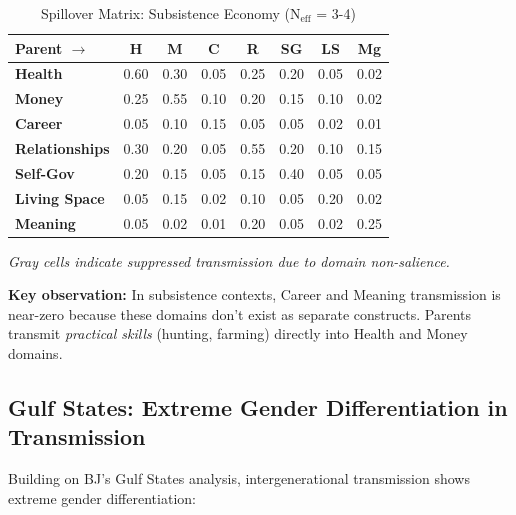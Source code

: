 \begin{table}[htbp]
\centering
\caption{Spillover Matrix: Subsistence Economy (N$_{\text{eff}}$ = 3-4)}
\label{tab:BI-subsistence-spillover}
\renewcommand{\arraystretch}{1.2}
\small
\begin{tabular}{@{}l|ccccccc@{}}
\toprule
\textbf{Parent $\rightarrow$} & \textbf{H} & \textbf{M} & \textbf{C} & \textbf{R} & \textbf{SG} & \textbf{LS} & \textbf{Mg} \\
\midrule
\textbf{Health} & \cellcolor{green!25}0.60 & 0.30 & 0.05 & 0.25 & 0.20 & 0.05 & 0.02 \\
\textbf{Money} & 0.25 & \cellcolor{green!25}0.55 & 0.10 & 0.20 & 0.15 & 0.10 & 0.02 \\
\textbf{Career} & \cellcolor{gray!20}0.05 & \cellcolor{gray!20}0.10 & \cellcolor{gray!20}0.15 & \cellcolor{gray!20}0.05 & \cellcolor{gray!20}0.05 & \cellcolor{gray!20}0.02 & \cellcolor{gray!20}0.01 \\
\textbf{Relationships} & 0.30 & 0.20 & 0.05 & \cellcolor{green!25}0.55 & 0.20 & 0.10 & 0.15 \\
\textbf{Self-Gov} & 0.20 & 0.15 & 0.05 & 0.15 & \cellcolor{green!15}0.40 & 0.05 & 0.05 \\
\textbf{Living Space} & \cellcolor{gray!20}0.05 & \cellcolor{gray!20}0.15 & \cellcolor{gray!20}0.02 & \cellcolor{gray!20}0.10 & \cellcolor{gray!20}0.05 & \cellcolor{gray!20}0.20 & \cellcolor{gray!20}0.02 \\
\textbf{Meaning} & \cellcolor{gray!20}0.05 & \cellcolor{gray!20}0.02 & \cellcolor{gray!20}0.01 & \cellcolor{gray!20}0.20 & \cellcolor{gray!20}0.05 & \cellcolor{gray!20}0.02 & \cellcolor{gray!20}0.25 \\
\bottomrule
\end{tabular}
\end{table}

\textit{Gray cells indicate suppressed transmission due to domain non-salience.}

\textbf{Key observation:} In subsistence contexts, Career and Meaning transmission is near-zero
because these domains don't exist as separate constructs. Parents transmit \textit{practical skills}
(hunting, farming) directly into Health and Money domains.

\subsection{Gulf States: Extreme Gender Differentiation in Transmission}

Building on BJ's Gulf States analysis, intergenerational transmission shows extreme
gender differentiation:

